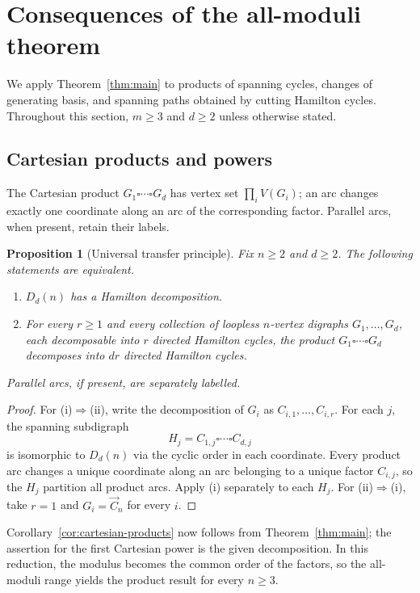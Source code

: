 \documentclass[11pt,reqno]{amsart}
\numberwithin{equation}{section}
\newtheorem{proposition}[theorem]{Proposition}
\theoremstyle{definition}
\theoremstyle{remark}
\begin{document}
\section{Consequences of the all-moduli theorem}\label{sec:consequences}
We apply Theorem~\ref{thm:main} to products of spanning cycles,
changes of generating basis, and spanning paths obtained by cutting Hamilton
cycles. Throughout this section, $m\ge3$ and $d\ge2$ unless otherwise stated.

\subsection{Cartesian products and powers}
The Cartesian product $G_1\square\cdots\square G_d$ has vertex set
$\prod_i V(G_i)$; an arc changes exactly one coordinate along an arc of the
corresponding factor. Parallel arcs, when present, retain their labels.

\begin{proposition}[Universal transfer principle]\label{prop:universal-transfer}
Fix $n\ge2$ and $d\ge2$. The following statements are equivalent.
\begin{enumerate}
\item $D_d(n)$ has a Hamilton decomposition.
\item For every $r\ge1$ and every collection of loopless $n$-vertex
      digraphs $G_1,\ldots,G_d$, each decomposable into $r$ directed
      Hamilton cycles, the product $G_1\square\cdots\square G_d$
      decomposes into $dr$ directed Hamilton cycles.
\end{enumerate}
Parallel arcs, if present, are separately labelled.
\end{proposition}
\begin{proof}
For (i)$\Rightarrow$(ii), write the decomposition of $G_i$ as
$C_{i,1},\ldots,C_{i,r}$. For each $j$, the spanning subdigraph
\[
 H_j=C_{1,j}\square\cdots\square C_{d,j}
\]
is isomorphic to $D_d(n)$ via the cyclic order in each coordinate.
Every product arc changes a unique coordinate along an arc belonging
to a unique factor $C_{i,j}$, so the $H_j$ partition all product arcs.
Apply (i) separately to each $H_j$. For (ii)$\Rightarrow$(i), take
$r=1$ and $G_i=\vec C_n$ for every $i$.
\end{proof}

Corollary~\ref{cor:cartesian-products} now follows from
Theorem~\ref{thm:main}; the assertion for the first Cartesian power is
the given decomposition. In this reduction, the modulus becomes the
common order of the factors, so the all-moduli range yields the product
result for every $n\ge3$.
\end{document}
